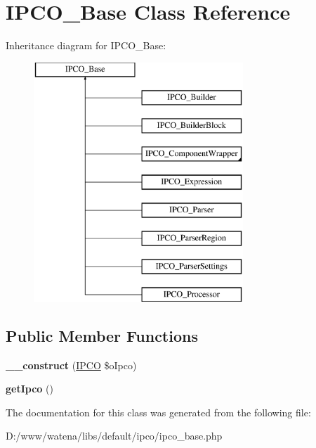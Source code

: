 \hypertarget{class_i_p_c_o___base}{\section{I\-P\-C\-O\-\_\-\-Base Class Reference}
\label{class_i_p_c_o___base}
}
Inheritance diagram for I\-P\-C\-O\-\_\-\-Base\-:\begin{figure}[H]
\begin{center}
\leavevmode
\includegraphics[height=9.000000cm]{class_i_p_c_o___base}
\end{center}
\end{figure}
\subsection*{Public Member Functions}
\begin{DoxyCompactItemize}
\item 
\hypertarget{class_i_p_c_o___base_a8b0615a1e25a7a3e5c2502d54fe07230}{{\bfseries \-\_\-\-\_\-construct} (\hyperlink{class_i_p_c_o}{I\-P\-C\-O} \$o\-Ipco)}\label{class_i_p_c_o___base_a8b0615a1e25a7a3e5c2502d54fe07230}

\item 
\hypertarget{class_i_p_c_o___base_afd0b809c76c651afdf040ec373d8e516}{{\bfseries get\-Ipco} ()}\label{class_i_p_c_o___base_afd0b809c76c651afdf040ec373d8e516}

\end{DoxyCompactItemize}


The documentation for this class was generated from the following file\-:\begin{DoxyCompactItemize}
\item 
D\-:/www/watena/libs/default/ipco/ipco\-\_\-base.\-php\end{DoxyCompactItemize}
